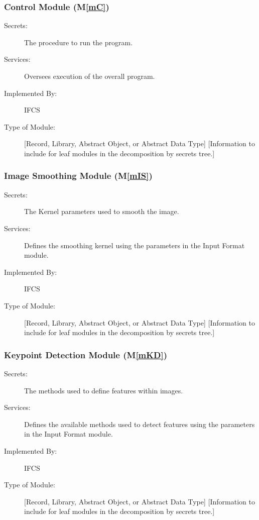 \documentclass[12pt, titlepage]{article}
\newcommand{\mref}[1]{M\ref{#1}}
\begin{document}
\subsubsection{Control Module (\mref{mC})}

\begin{description}
\item[Secrets:]The procedure to run the program.
\item[Services:]Oversees execution of the overall program.
\item[Implemented By:] IFCS
\item[Type of Module:] [Record, Library, Abstract Object, or Abstract Data Type]
  [Information to include for leaf modules in the decomposition by secrets tree.]
\end{description}

\subsubsection{Image Smoothing Module (\mref{mIS})}

\begin{description}
\item[Secrets:]The Kernel parameters used to smooth the image.
\item[Services:]Defines the smoothing kernel using the parameters in the Input 
Format module.
\item[Implemented By:] IFCS
\item[Type of Module:] [Record, Library, Abstract Object, or Abstract Data Type]
  [Information to include for leaf modules in the decomposition by secrets tree.]
\end{description}

\subsubsection{Keypoint Detection Module (\mref{mKD})}

\begin{description}
\item[Secrets:]The methods used to define features within images.
\item[Services:]Defines the available methods used to detect features using the 
parameters in the Input Format module.
\item[Implemented By:] IFCS
\item[Type of Module:] [Record, Library, Abstract Object, or Abstract Data Type]
  [Information to include for leaf modules in the decomposition by secrets tree.]
\end{description}
\end{document}
